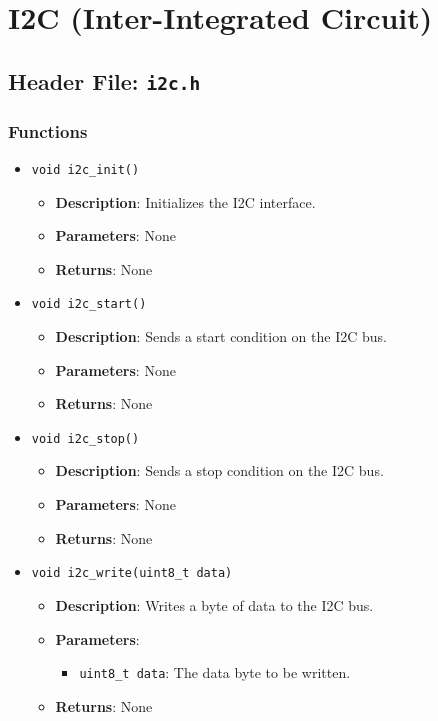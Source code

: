 \documentclass{article}
\begin{document}
\section{I2C (Inter-Integrated Circuit)}

\subsection{Header File: \texttt{i2c.h}}

\subsubsection{Functions}

\begin{itemize}
   \item \texttt{void i2c\_init()}
   \begin{itemize}
      \item \textbf{Description}: Initializes the I2C interface.
      \item \textbf{Parameters}: None
      \item \textbf{Returns}: None
   \end{itemize}

   \item \texttt{void i2c\_start()}
   \begin{itemize}
      \item \textbf{Description}: Sends a start condition on the I2C bus.
      \item \textbf{Parameters}: None
      \item \textbf{Returns}: None
   \end{itemize}

   \item \texttt{void i2c\_stop()}
   \begin{itemize}
      \item \textbf{Description}: Sends a stop condition on the I2C bus.
      \item \textbf{Parameters}: None
      \item \textbf{Returns}: None
   \end{itemize}

   \item \texttt{void i2c\_write(uint8\_t data)}
   \begin{itemize}
      \item \textbf{Description}: Writes a byte of data to the I2C bus.
      \item \textbf{Parameters}:
      \begin{itemize}
         \item \texttt{uint8\_t data}: The data byte to be written.
      \end{itemize}
      \item \textbf{Returns}: None
   \end{itemize}
\end{itemize}
\end{document}
